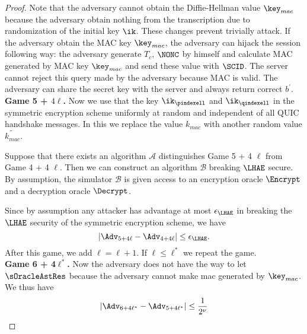 \begin{proof}
 Note that the adversary cannot obtain the Diffie-Hellman value $\key_{mac}$ because the adversary obtain nothing from the transcription due to randomization of the initial key $\ik$. These changes prevent trivially attack. If the adversary obtain the MAC key $\key_{mac}$, the adversary can hijack the session following way: the adversary generate $T_c$, $\NONC$ by himself and calculate MAC generated by MAC key $\key_{mac}$ and send these value with $\SCID$. The server cannot reject this query made by the adversary because MAC is valid. The adversary can share the secret key with the server and always return correct $b^{\prime}$.
\vspace{10pt}\\%
%
%
 \textbf{Game 5 + $4\ell$.} Now we use that the key $\ik_{\pindexell}$ and $\ik_{\qindexell}$ in the symmetric encryption scheme uniformly at random and independent of all QUIC handshake messages. In this we replace the value $k_{mac}$ with another random value $\widetilde{k_{mac}}$.

 Suppose that there exists an algorithm $\mathcal{A}$ distinguishes Game 5 + 4 $\ell$ from Game 4 + 4 $\ell$. Then we can construct an algorithm $\mathcal{B}$ breaking $\LHAE$ secure. By assumption, the simulator $\mathcal{B}$ is given access to an encryption oracle $\Encrypt$ and a decryption oracle $\Decrypt$.

 Since by assumption any attacker has advantage at most $\epsilon_{\LHAE}$ in breaking the $\LHAE$ security of the symmetric encryption scheme, we have
 \begin{equation}
  |\Adv_{5 + 4\ell} - \Adv_{4 + 4\ell}| \leq \epsilon_{\LHAE}.
 \end{equation}%
 After this game, we add $\ell = \ell + 1$. If $\ell \leq \ell^{\ast}$ we repeat the game.
\vspace{10pt}\\%
%
 \textbf{Game 6 + 4$\ell^{\ast}$.} Now the adversary does not have the way to let $\sOracleAstRes$ because the adversary cannot make mac generated by $\key_{mac}$. We thus have
 \begin{equation}
  |\Adv_{6 + 4\ell^{\ast}} - \Adv_{5 + 4\ell^{\ast}}| \leq \frac{1}{2^{\nu}}
 \end{equation}%
%
%
\end{proof}